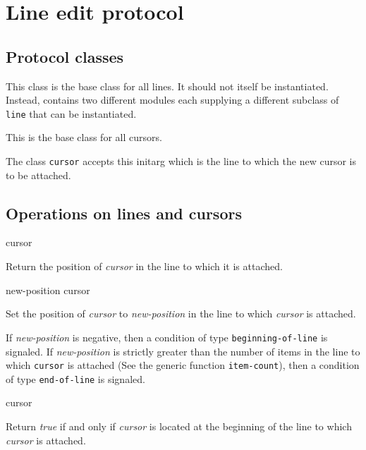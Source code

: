 \section{Line edit protocol}
\label{sec-edit-protocol}

\subsection{Protocol classes}


This class is the base class for all lines.  It should not itself be
instantiated.  Instead, \sysname{} contains two different modules
each supplying a different subclass of \texttt{line} that can be
instantiated.


This is the base class for all cursors.


The class \texttt{cursor} accepts this initarg which is the line to
which the new cursor is to be attached.

\subsection{Operations on lines and cursors}

 {cursor}

Return the position of \textit{cursor} in the line to which it is
attached.

\ifdetached{}

 {new-position cursor}

Set the position of \textit{cursor} to \textit{new-position} in the line
to which \textit{cursor} is attached.

\ifdetached{}

If \textit{new-position} is negative, then a condition of type
\texttt{beginning-of-line} is signaled.  If \textit{new-position} is
strictly greater than the number of items in the line to which
\texttt{cursor} is attached (See the generic function
\texttt{item-count}), then a condition of type \texttt{end-of-line} is
signaled.

 {cursor}

Return \textit{true} if and only if \textit{cursor} is located at the
beginning of the line to which \textit{cursor} is attached.

\ifdetached{}

